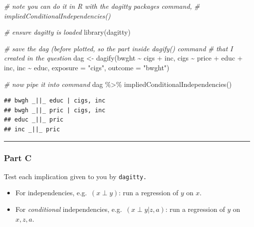 \documentclass[
]{article}
\newenvironment{Shaded}{\begin{snugshade}}{\end{snugshade}}
\newcommand{\AttributeTok}[1]{\textcolor[rgb]{0.77,0.63,0.00}{#1}}
\newcommand{\CommentTok}[1]{\textcolor[rgb]{0.56,0.35,0.01}{\textit{#1}}}
\newcommand{\FunctionTok}[1]{\textcolor[rgb]{0.00,0.00,0.00}{#1}}
\newcommand{\NormalTok}[1]{#1}
\newcommand{\OtherTok}[1]{\textcolor[rgb]{0.56,0.35,0.01}{#1}}
\newcommand{\SpecialCharTok}[1]{\textcolor[rgb]{0.00,0.00,0.00}{#1}}
\newcommand{\StringTok}[1]{\textcolor[rgb]{0.31,0.60,0.02}{#1}}
\providecommand{\tightlist}{%
  \setlength{\itemsep}{0pt}\setlength{\parskip}{0pt}}
\begin{document}
\begin{Shaded}
\begin{Highlighting}[]
\CommentTok{\# note you can do it in R with the dagitty package\textquotesingle{}s command,}
\CommentTok{\# impliedConditionalIndependencies()}

\CommentTok{\# ensure dagitty is loaded}
\FunctionTok{library}\NormalTok{(dagitty)}

\CommentTok{\# save the dag (before plotted, so the part inside dagify() command}
\CommentTok{\# that I created in the question}
\NormalTok{dag }\OtherTok{\textless{}{-}} \FunctionTok{dagify}\NormalTok{(bwght }\SpecialCharTok{\textasciitilde{}}\NormalTok{ cigs }\SpecialCharTok{+}\NormalTok{ inc,}
\NormalTok{       cigs }\SpecialCharTok{\textasciitilde{}}\NormalTok{ price }\SpecialCharTok{+}\NormalTok{ educ }\SpecialCharTok{+}\NormalTok{ inc,}
\NormalTok{       inc }\SpecialCharTok{\textasciitilde{}}\NormalTok{ educ,}
       \AttributeTok{exposure =} \StringTok{"cigs"}\NormalTok{,}
       \AttributeTok{outcome =} \StringTok{"bwght"}\NormalTok{)}

\CommentTok{\# now pipe it into command}
\NormalTok{dag }\SpecialCharTok{\%\textgreater{}\%} \FunctionTok{impliedConditionalIndependencies}\NormalTok{()}
\end{Highlighting}
\end{Shaded}

\begin{verbatim}
## bwgh _||_ educ | cigs, inc
## bwgh _||_ pric | cigs, inc
## educ _||_ pric
## inc _||_ pric
\end{verbatim}

\begin{center}\rule{0.5\linewidth}{0.5pt}\end{center}

\hypertarget{part-c-2}{%
\subsubsection{Part C}\label{part-c-2}}

Test each implication given to you by \texttt{dagitty.}

\begin{itemize}
\tightlist
\item
  For independencies, e.g.~\((x \perp y)\): run a regression of \(y\) on
  \(x\).
\item
  For \emph{conditional} independencies, e.g.~\((x \perp y | z, a)\):
  run a regression of \(y\) on \(x, z, a\).
\end{itemize}
\end{document}
